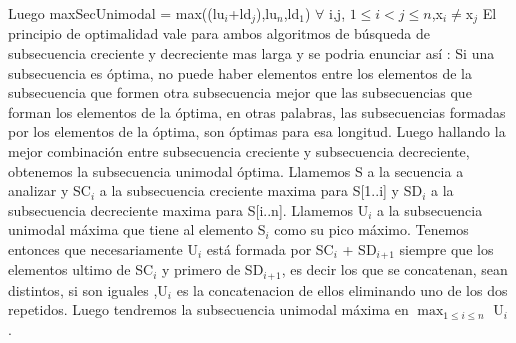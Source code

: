 Luego maxSecUnimodal = max((lu$_i$+ld$_j$),lu$_n$,ld$_1$)\hspace{0.1cm} $\forall$ i,j, $1\leq i<j\leq n$,x${_i} \not =$x${_j}$ 
\newline
El principio de optimalidad vale para ambos algoritmos de búsqueda de subsecuencia creciente y decreciente mas larga y se podria enunciar así : 
\newline
Si una subsecuencia es óptima, no puede haber elementos entre los elementos de la subsecuencia que formen otra subsecuencia mejor que las subsecuencias que forman los elementos de la óptima, en otras palabras, las subsecuencias formadas por los elementos de la óptima, son óptimas para esa longitud.
Luego hallando la mejor combinación entre subsecuencia creciente y subsecuencia decreciente, obtenemos la subsecuencia unimodal óptima. 
\newline
Llamemos S  a la secuencia a analizar y SC${_i}$ a la subsecuencia creciente maxima para S[1..i] y SD${_i}$ a la subsecuencia decreciente maxima para S[i..n].
\newline
Llamemos U${_i}$ a la subsecuencia unimodal máxima que tiene al elemento S${_i}$ como su pico máximo.
Tenemos entonces que necesariamente U${_i}$ está formada por SC${_i}$ +  SD${_i}{_+}{_1}$ siempre que los elementos ultimo de SC${_i}$ y primero de SD${_i}{_+}{_1}$, es decir los que se concatenan, sean distintos, si son iguales ,U${_i}$ es la concatenacion de ellos eliminando uno de los dos repetidos.
\newline
Luego tendremos la subsecuencia unimodal máxima en $\max_{1\leq i\leq n}$ U${_i}$ .
\newline